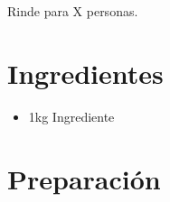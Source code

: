 
Rinde para X personas.


\section*{Ingredientes}
\begin{itemize}
\setlength{\itemsep}{0pt}
\setlength{\parsep}{0pt} \setlength{\parskip}{0pt}
\item 1kg Ingrediente
\end{itemize}
\section*{Preparación}


